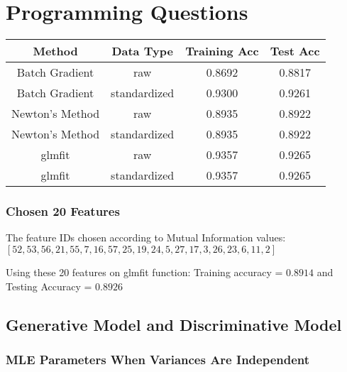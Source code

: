\documentclass[letter,11pt]{article}
\begin{document}
		\section{Programming Questions}
		\begin{center}
			\begin{tabular}{|c| c |c |c|} 
				\hline
				Method & Data Type & Training Acc & Test Acc \\ [0.5ex] 
				\hline
				Batch Gradient & raw & 0.8692 & 0.8817 \\ 
				\hline
				Batch Gradient & standardized & 0.9300 & 0.9261 \\
				\hline
				Newton's Method & raw & 0.8935 & 0.8922 \\
				\hline
				Newton's Method & standardized & 0.8935 & 0.8922 \\
				\hline
				glmfit & raw & 0.9357 & 0.9265 \\
				\hline
			    glmfit & standardized & 0.9357 & 0.9265 \\
				\hline
			\end{tabular}
		\end{center}
	\subsubsection{Chosen 20 Features}
	The feature IDs chosen according to Mutual Information values:\\
	$[52,53,56,21,55,7,16,57,25,19,24,5,27,17,3,26,23,6,11,2]$
	
	Using these 20 features on glmfit function: 
	Training accuracy = $0.8914$ and Testing Accuracy = $0.8926$
	
	\subsection{Generative Model and Discriminative Model}
	\subsubsection{MLE Parameters When Variances Are Independent}
	
\end{document}
